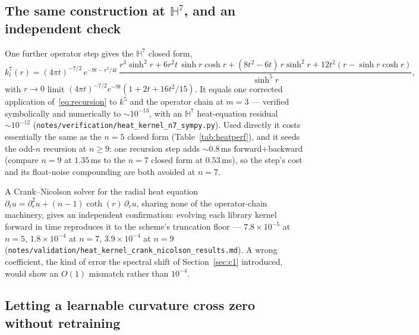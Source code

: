 \documentclass{article}
\newcommand{\Hyp}{\mathbb{H}}
\newcommand{\code}[1]{\texttt{#1}}
\begin{document}
\subsection{The same construction at $\Hyp^7$, and an independent check}
\label{sec:c2b}

One further operator step gives the $\Hyp^7$ closed form,
\begin{equation}
  k^7_t(r) = (4\pi t)^{-7/2}\, e^{-9t - r^2/4t}\,
  \frac{r^3\sinh^2 r + 6r^2 t\,\sinh r\cosh r
        + (8t^2 - 6t)\,r\sinh^2 r + 12t^2(r - \sinh r\cosh r)}{\sinh^5 r},
  \label{eq:n7}
\end{equation}
with $r \to 0$ limit $(4\pi t)^{-7/2} e^{-9t}(1 + 2t + 16t^2/15)$. It
equals one corrected application of~\eqref{eq:recursion} to $k^5$ and the
operator chain at $m = 3$ --- verified symbolically and numerically to
$\sim\!10^{-13}$, with an $\Hyp^7$ heat-equation residual $\sim\!10^{-12}$
(\code{notes/verification/heat\_kernel\_n7\_sympy.py}). Used directly it
costs essentially the same as the $n = 5$ closed form
(Table~\ref{tab:heatperf}), and it seeds the odd-$n$ recursion at
$n \ge 9$: one recursion step adds $\sim\!0.8$\,ms forward+backward
(compare $n = 9$ at $1.35$\,ms to the $n = 7$ closed form at
$0.53$\,ms), so the step's cost and its float-noise compounding are both
avoided at $n = 7$.

A Crank--Nicolson solver for the radial heat equation
$\partial_t u = \partial_r^2 u + (n-1)\coth(r)\,\partial_r u$, sharing
none of the operator-chain machinery, gives an independent confirmation:
evolving each library kernel forward in time reproduces it to the
scheme's truncation floor --- $7.8\times10^{-5}$ at $n = 5$,
$1.8\times10^{-4}$ at $n = 7$, $3.9\times10^{-4}$ at $n = 9$
(\code{notes/validation/heat\_kernel\_crank\_nicolson\_results.md}). A
wrong coefficient, the kind of error the spectral shift of
Section~\ref{sec:c1} introduced, would show an $O(1)$ mismatch rather
than $10^{-4}$.

\subsection{Letting a learnable curvature cross zero without retraining}
\label{sec:c4}
\end{document}
